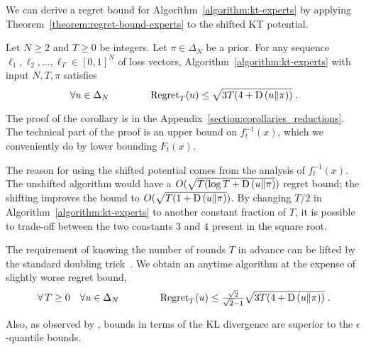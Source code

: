 We can derive a regret bound for Algorithm~\ref{algorithm:kt-experts} by
applying Theorem~\ref{theorem:regret-bound-experts} to the shifted KT
potential.  \begin{corollary} \label{corollary:kt-experts-regret} Let
$N \ge 2$ and $T \ge 0$ be integers. Let $\pi \in \Delta_N$ be a prior.  For
any sequence $\ell_1, \ell_2, \dots, \ell_T \in [0,1]^N$ of loss vectors,
Algorithm~\ref{algorithm:kt-experts} with input $N,T,\pi$ satisfies
\[
\forall u \in \Delta_N \qquad \qquad \operatorname{Regret}_T(u) \le \sqrt{3T (4 + \operatorname*{D}\left({u}\middle\|{\pi}\right))} \; .
\]
\end{corollary}
The proof of the corollary is in the
Appendix~\ref{section:corollaries_reductions}.  The technical part of the proof
is an upper bound on $f_t^{-1}(x)$, which we conveniently do by lower bounding
$F_t(x)$.

The reason for using the shifted potential comes from the analysis of
$f_t^{-1}(x)$. The unshifted algorithm would have a $O(\sqrt{T (\log T +
\operatorname*{D}\left({u}\middle\|{\pi}\right)})$ regret bound; the shifting improves the bound to $O(\sqrt{T (1 +
\operatorname*{D}\left({u}\middle\|{\pi}\right)})$.  By changing $T/2$ in Algorithm~\ref{algorithm:kt-experts} to
another constant fraction of $T$, it is possible to trade-off between the two
constants $3$ and $4$ present in the square root.

The requirement of knowing the number of rounds $T$ in advance can be lifted by
the standard doubling trick~\citep[Section 2.3.1]{Shalev-Shwartz-2011}. We
obtain an anytime algorithm at the expense of slightly worse regret bound,
\[
\forall \, T \ge 0 \quad \forall u \in \Delta_N \qquad \qquad
\operatorname{Regret}_T(u) \le \tfrac{\sqrt{2}}{\sqrt{2} - 1} \sqrt{3T (4 + \operatorname*{D}\left({u}\middle\|{\pi}\right))} \; .
\]

Also, as observed by \citet{Chernov-Vovk-2010}, bounds in terms of the KL
divergence are superior to the $\epsilon$-quantile bounds.
